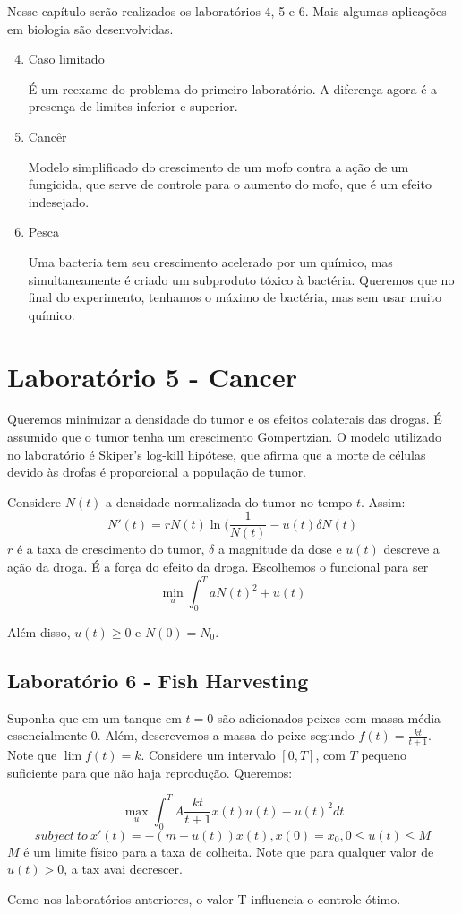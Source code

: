 Nesse capítulo serão realizados os laboratórios 4, 5 e 6. Mais algumas
aplicações em biologia são desenvolvidas.

\begin{enumerate}[label=\textbf{Lab \arabic*:}]
    \setcounter{enumi}{3}

    \item Caso limitado 
    
    É um reexame do problema do primeiro laboratório. A diferença agora é a
    presença de limites inferior e superior. 

    \item Cancêr 
    
    Modelo simplificado do crescimento de um mofo contra a ação de um
    fungicida, que serve de controle para o aumento do mofo, que é um efeito
    indesejado. 

    \item Pesca  
    
    Uma bacteria tem seu crescimento acelerado por um químico, mas
    simultaneamente é criado um subproduto tóxico à bactéria. Queremos que no
    final do experimento, tenhamos o máximo de bactéria, mas sem usar muito
    químico. 
\end{enumerate}
 

\section{Laboratório 5 - Cancer}

Queremos minimizar a densidade do tumor e os efeitos colaterais das drogas. É assumido que o tumor tenha um crescimento Gompertzian. O modelo utilizado no laboratório é Skiper's log-kill hipótese, que afirma que a morte de células devido às drofas é proporcional a população de tumor. 

Considere $N(t)$ a densidade normalizada do tumor no tempo $t$. Assim:
$$N'(t) = rN(t)\ln(\frac{1}{N(t)} - u(t)\delta N(t)$$
$r$ é a taxa de crescimento do tumor, $\delta$ a magnitude da dose e $u(t)$ descreve a ação da droga. É a força do efeito da droga. Escolhemos o funcional para ser 
$$\min_u \int_0^T aN(t)^2 + u(t)$$

Além disso, $u(t) \geq 0$ e $N(0) = N_0$. 

\subsection{Laboratório 6 - Fish Harvesting}

Suponha que em um tanque em $t = 0$ são adicionados peixes com massa média essencialmente 0. Além, descrevemos a massa do peixe segundo $f(t) = \frac{kt}{t+1}$. Note que $\lim f(t) = k$. Considere um intervalo $[0,T]$, com $T$ pequeno suficiente para que não haja reprodução. Queremos:

$$
\max_u \int_0^T A\frac{kt}{t+1}x(t)u(t) - u(t)^2 dt
$$
$$
subject~to~x'(t) = -(m + u(t))x(t), x(0) = x_0, 0 \leq u(t) \leq M
$$
$M$ é um limite físico para a taxa de colheita. Note que para qualquer valor de $u(t) > 0$, a tax avai decrescer. 

Como nos laboratórios anteriores, o valor T influencia o controle ótimo. 

